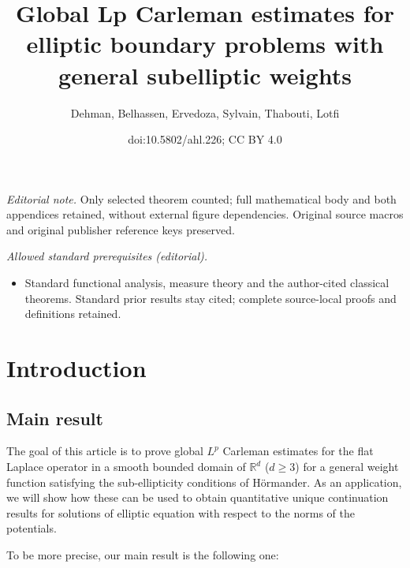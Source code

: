 \documentclass[10pt]{amsart}
\title{Global Lp Carleman estimates for elliptic boundary problems with general subelliptic weights}
\author{Dehman, Belhassen, Ervedoza, Sylvain, Thabouti, Lotfi}
\date{doi:10.5802/ahl.226; CC BY 4.0}
\theoremstyle{definition}\newtheorem{defi}[theo]{Definition}\newtheorem{rema}[theo]{Remark}\newtheorem{exam}[theo]{Example}\newtheorem{exem}[theo]{Example}\newtheorem{nota}[theo]{Notation}
\newcommand*\R{\mathbb{R}}
\renewcommand{\geq}{\geqslant}
\begin{document}
\maketitle
\noindent\textit{Editorial note.} Only selected theorem counted; full mathematical body and both appendices retained, without external figure dependencies. Original source macros and original publisher reference keys preserved.\par\medskip
\noindent\textit{Allowed standard prerequisites (editorial).}\begin{itemize}
\item Standard functional analysis, measure theory and the author-cited classical theorems. Standard prior results stay cited; complete source-local proofs and definitions retained.
\end{itemize}\medskip

\section{Introduction}

\subsection*{Main result}
The goal of this article is to prove global $L^p$ Carleman estimates for the flat Laplace operator in a smooth bounded domain of $\R^d$ ($d \geq 3$) for a general weight function satisfying the sub-ellipticity conditions of Hörmander. As an application, we will show how these can be used to obtain quantitative unique continuation results for solutions of elliptic equation with respect to the norms of the potentials.

To be more precise, our main result is the following one:
\end{document}
